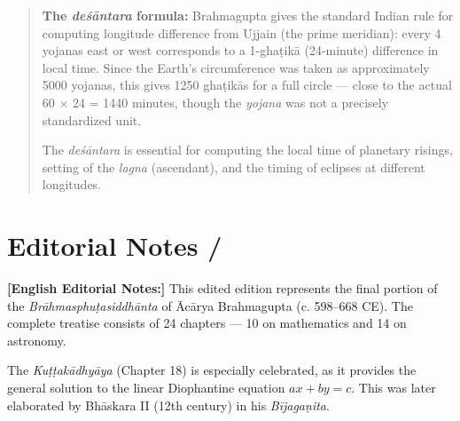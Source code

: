 \documentclass[10pt,a4paper]{article}
\newenvironment{engcommentary}
  {\begin{quote}\small\color{sectioncolor}}
  {\end{quote}}
\begin{document}
\vspace{1.5em}

\begin{engcommentary}
\textbf{The \textit{deśāntara} formula:} Brahmagupta gives the standard Indian rule for
computing longitude difference from Ujjain (the prime meridian): every 4 yojanas
east or west corresponds to a 1-ghaṭikā (24-minute) difference in local time.
Since the Earth's circumference was taken as approximately 5000 yojanas,
this gives 1250 ghaṭikās for a full circle --- close to the actual 60 $\times$ 24 = 1440
minutes, though the \textit{yojana} was not a precisely standardized unit.

The \textit{deśāntara} is essential for computing the local time of planetary risings,
setting of the \textit{lagna} (ascendant), and the timing of eclipses at different longitudes.
\end{engcommentary}

\vspace{1em}
\longline


\newpage
\section*{Editorial Notes / }

\begin{minipage}[t]{0.47\textwidth}
\end{minipage}%
\hfill\vline\hfill%
\begin{minipage}[t]{0.47\textwidth}
\textbf{[English Editorial Notes:]}
This edited edition represents the final portion of the \textit{Brāhmasphuṭasiddhānta}
of Ācārya Brahmagupta (c. 598--668 CE). The complete treatise consists of 24 chapters ---
10 on mathematics and 14 on astronomy.

The \textit{Kuṭṭakādhyāya} (Chapter 18) is especially celebrated, as it provides the general
solution to the linear Diophantine equation $ax + by = c$. This was later elaborated by
Bhāskara II (12th century) in his \textit{Bījagaṇita}.
\end{minipage}
\end{document}
